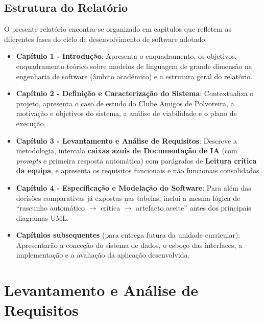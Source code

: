\documentclass[a4paper,12pt]{scrreprt}
\begin{document}
\section{Estrutura do Relatório}
O presente relatório encontra-se organizado em capítulos que refletem as diferentes fases do ciclo de desenvolvimento de software adotado:

\begin{itemize}
    \item \textbf{Capítulo 1 - Introdução}: Apresenta o enquadramento, os objetivos, enquadramento teórico sobre modelos de linguagem de grande dimensão na engenharia de software (âmbito académico) e a estrutura geral do relatório.

    \item \textbf{Capítulo 2 - Definição e Caracterização do Sistema}: Contextualiza o projeto, apresenta o caso de estudo do Clube Amigos de Polvoreira, a motivação e objetivos do sistema, a análise de viabilidade e o plano de execução.

    \item \textbf{Capítulo 3 - Levantamento e Análise de Requisitos}: Descreve a metodologia, intercala \textbf{caixas azuis de Documentação de IA} (com \textit{prompts} e primeira resposta automática) com parágrafos de \textbf{Leitura crítica da equipa}, e apresenta os requisitos funcionais e não funcionais consolidados.

    \item \textbf{Capítulo 4 - Especificação e Modelação do Software}: Para além das decisões comparativas já expostas nas tabelas, inclui a mesma lógica de ``rascunho automático $\rightarrow$ crítica $\rightarrow$ artefacto aceite'' antes dos principais diagramas UML.

    \item \textbf{Capítulos subsequentes} (para entrega futura da unidade curricular): Apresentarão a conceção do sistema de dados, o esboço das interfaces, a implementação e a avaliação da aplicação desenvolvida.
\end{itemize}


\chapter{Levantamento e Análise de Requisitos}
\end{document}
